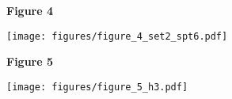 \documentclass[8pt]{extarticle}
\begin{document}
\newpage

\textbf{\large Figure 4}

\texttt{[image: figures/figure\_4\_set2\_spt6.pdf]}


\newpage

\textbf{\large Figure 5}

\texttt{[image: figures/figure\_5\_h3.pdf]}
\end{document}
